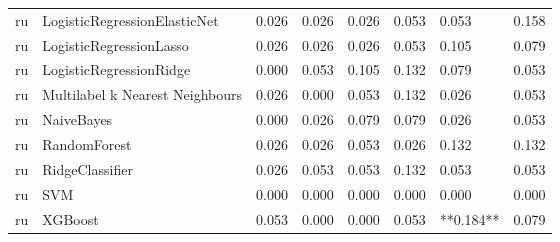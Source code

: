 \begin{tabular}{llllllll}
      ru &    LogisticRegressionElasticNet &     0.026 &                     0.026 &                 0.026 &                  0.053 &                                   0.053 &     0.158 \\
      ru &         LogisticRegressionLasso &     0.026 &                     0.026 &                 0.026 &                  0.053 &                                   0.105 &     0.079 \\
      ru &         LogisticRegressionRidge &     0.000 &                     0.053 &                 0.105 &                  0.132 &                                   0.079 &     0.053 \\
      ru & Multilabel k Nearest Neighbours &     0.026 &                     0.000 &                 0.053 &                  0.132 &                                   0.026 &     0.053 \\
      ru &                      NaiveBayes &     0.000 &                     0.026 &                 0.079 &                  0.079 &                                   0.026 &     0.053 \\
      ru &                    RandomForest &     0.026 &                     0.026 &                 0.053 &                  0.026 &                                   0.132 &     0.132 \\
      ru &                 RidgeClassifier &     0.026 &                     0.053 &                 0.053 &                  0.132 &                                   0.053 &     0.053 \\
      ru &                             SVM &     0.000 &                     0.000 &                 0.000 &                  0.000 &                                   0.000 &     0.000 \\
      ru &                         XGBoost &     0.053 &                     0.000 &                 0.000 &                  0.053 &                               **0.184** &     0.079 \\
\bottomrule
\end{tabular}
